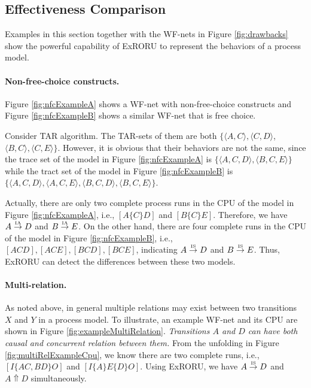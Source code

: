 \documentclass{llncs}
\begin{document}
\subsection{Effectiveness Comparison}\label{subsec:effectiveness}
Examples in this section together with the WF-nets in Figure \ref{fig:drawbacks} show the powerful capability of ExRORU to represent the behaviors of a process model.

\paragraph{\textbf{Non-free-choice constructs.}}\label{par:nfc} 
Figure \ref{fig:nfcExampleA} shows a WF-net with non-free-choice constructs \cite{de2003workflow} and Figure \ref{fig:nfcExampleB} shows a similar WF-net that is free choice.

Consider TAR algorithm. The TAR-sets of them are both $\{\langle A,C\rangle, \langle C,D\rangle$, $\langle B,C\rangle, \langle C,E\rangle\}$. However, it is obvious that their behaviors are not the same, since the trace set of the model in Figure \ref{fig:nfcExampleA} is $\{\langle A,C,D\rangle,\langle B,C,E\rangle\}$ while the tract set of the model in Figure \ref{fig:nfcExampleB} is $\{\langle A,C,D\rangle,\langle A,C,E\rangle,\langle B,C,D\rangle,\langle B,C,E\rangle\}$.

Actually, there are only two complete process runs in the CPU of the model in Figure \ref{fig:nfcExampleA}, i.e., $[A\{C\}D]$ and $[B\{C\}E]$. Therefore, we have $A\overset{\text{\tiny{IA}}}{\rightarrow}D$ and $B\overset{\text{\tiny{IA}}}{\rightarrow}E$. On the other hand, there are four complete runs in the CPU of the model in Figure \ref{fig:nfcExampleB}, i.e., $[ACD],[ACE],[BCD],[BCE]$, indicating $A\overset{\text{\tiny{IS}}}{\rightarrow}D$ and $B\overset{\text{\tiny{IS}}}{\rightarrow}E$. Thus, ExRORU can detect the differences between these two models.

\paragraph{\textbf{Multi-relation.}} As noted above, in general multiple relations may exist between two transitions $X$ and $Y$ in a process model. To illustrate, an example WF-net and its CPU are shown in Figure \ref{fig:exampleMultiRelation}. \textit{Transitions $A$ and $D$ can have both causal and concurrent relation between them.} From the unfolding in Figure \ref{fig:multiRelExampleCpu}, we know there are two complete runs, i.e., $[I\{AC,BD\}O]$ and $[I\{A\}E\{D\}O]$. Using ExRORU, we have $A\overset{\text{\tiny{IS}}}{\rightarrow}D$ and $A\Uparrow D$ simultaneously.
\end{document}
